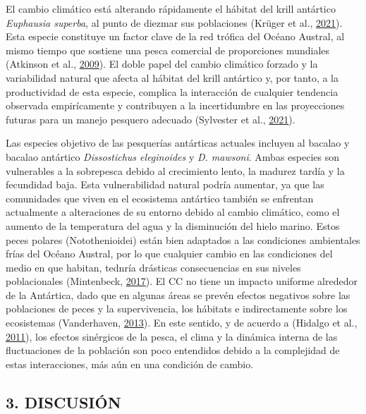 \documentclass[
]{article}
\begin{document}
El cambio climático está alterando rápidamente el hábitat del krill
antártico \emph{Euphausia superba}, al punto de diezmar sus poblaciones
(Krüger et al., \protect\hyperlink{ref-Kruger2021}{2021}). Esta especie
constituye un factor clave de la red trófica del Océano Austral, al
mismo tiempo que sostiene una pesca comercial de proporciones mundiales
(Atkinson et al., \protect\hyperlink{ref-Atkinson2009}{2009}). El doble
papel del cambio climático forzado y la variabilidad natural que afecta
al hábitat del krill antártico y, por tanto, a la productividad de esta
especie, complica la interacción de cualquier tendencia observada
empirícamente y contribuyen a la incertidumbre en las proyecciones
futuras para un manejo pesquero adecuado (Sylvester et al.,
\protect\hyperlink{ref-Sylvester2021}{2021}).

Las especies objetivo de las pesquerías antárticas actuales incluyen al
bacalao y bacalao antártico \emph{Dissostichus eleginoides} y \emph{D.
mawsoni}. Ambas especies son vulnerables a la sobrepesca debido al
crecimiento lento, la madurez tardía y la fecundidad baja. Esta
vulnerabilidad natural podría aumentar, ya que las comunidades que viven
en el ecosistema antártico también se enfrentan actualmente a
alteraciones de su entorno debido al cambio climático, como el aumento
de la temperatura del agua y la disminución del hielo marino. Estos
peces polares (Notothenioidei) están bien adaptados a las condiciones
ambientales frías del Océano Austral, por lo que cualquier cambio en las
condiciones del medio en que habitan, tednría drásticas consecuencias en
sus niveles poblacionales (Mintenbeck,
\protect\hyperlink{ref-Mintenbeck2017}{2017}). El CC no tiene un impacto
uniforme alrededor de la Antártica, dado que en algunas áreas se prevén
efectos negativos sobre las poblaciones de peces y la supervivencia, los
hábitats e indirectamente sobre los ecosistemas (Vanderhaven,
\protect\hyperlink{ref-Vanderhaven2013}{2013}). En este sentido, y de
acuerdo a (Hidalgo et al., \protect\hyperlink{ref-Hidalgo2011}{2011}),
los efectos sinérgicos de la pesca, el clima y la dinámica interna de
las fluctuaciones de la población son poco entendidos debido a la
complejidad de estas interacciones, más aún en una condición de cambio.

\pagebreak

\hypertarget{discusiuxf3n}{%
\subsection{3. DISCUSIÓN}\label{discusiuxf3n}}
\end{document}
